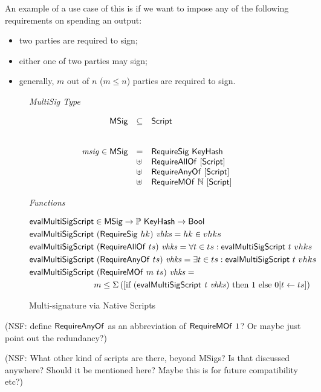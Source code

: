 An example of a use case of this is if we want to impose any of the following
requirements on spending an output:
\begin{itemize}
\item two parties are required to sign;
\item either one of two parties may sign;
\item generally, $m$ out of $n$ ($m \leq n$) parties are required to sign.
\end{itemize}

\begin{figure*}[hbt]
  \emph{MultiSig Type}

  \begin{equation*}
    \begin{array}{rll}
      \mathsf{MSig} & \subseteq & \mathsf{Script} \\
      \\~\\
      \mathit{msig}\in\mathsf{MSig} & = & \mathsf{RequireSig}~\mathsf{KeyHash}\\
      & \uplus &
         \mathsf{RequireAllOf}~[\mathsf{Script}] \\
      & \uplus&
         \mathsf{RequireAnyOf}~[\mathsf{Script}] \\
      & \uplus&
        \mathsf{RequireMOf}~\mathbb{N}~[\mathsf{Script}]
    \end{array}
  \end{equation*}

  \emph{Functions}

  \begin{align*}
    \mathsf{evalMultiSigScript} & \in\mathsf{MSig}\to\mathbb{P}~\mathsf{KeyHash}\to\mathsf{Bool} & \\
    \mathsf{evalMultiSigScript} & ~(\mathsf{RequireSig}~hk)~\mathit{vhks} =  hk \in vhks \\
    \mathsf{evalMultiSigScript} & ~(\mathsf{RequireAllOf}~ts)~\mathit{vhks} =
                              \forall t \in ts: \mathsf{evalMultiSigScript}~t~vhks\\
    \mathsf{evalMultiSigScript} & ~(\mathsf{RequireAnyOf}~ts)~\mathit{vhks} =
                              \exists t \in ts: \mathsf{evalMultiSigScript}~t~vhks\\
    \mathsf{evalMultiSigScript} & ~(\mathsf{RequireMOf}~m~ts)~\mathit{vhks} = \\
                             & m \leq \Sigma
                               \left(
                               [\textrm{if}~(\mathsf{evalMultiSigScript}~\mathit{t}~\mathit{vhks})~
                               \textrm{then}~1~\textrm{else}~0\vert t \leftarrow ts]
                               \right)
  \end{align*}

  \caption{Multi-signature via Native Scripts}
  \label{fig:types-msig}
\end{figure*}

(NSF: define $\mathsf{RequireAnyOf}$ as an abbreviation of $\mathsf{RequireMOf}~1$?
Or maybe just point out the redundancy?)

(NSF: What other kind of scripts are there, beyond MSigs? Is that discussed
anywhere? Should it be mentioned here? Maybe this is for future compatibility
etc?)

\clearpage

